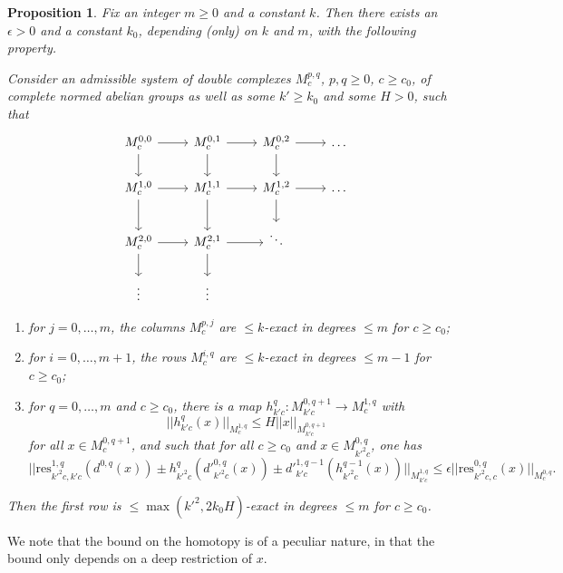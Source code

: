 \documentclass[11pt]{amsart}
\numberwithin{equation}{section}
\numberwithin{theorem}{section}
\newtheorem{proposition}[theorem]{Proposition}
\theoremstyle{definition}
\begin{document}
\begin{proposition}\label{prop:key} Fix an integer $m\geq 0$ and a constant $k$. Then there exists an $\epsilon>0$ and a constant $k_0$, depending (only) on $k$ and $m$, with the following property.

Consider an admissible system of double complexes $M^{p,q}_c$, $p,q\geq 0$, $c\geq c_0$, of complete normed abelian groups as well as some $k'\geq k_0$ and some $H>0$, such that
\[
	\begin{tikzcd}
		M^{0,0}_c \ar[r]{d'^{0,0}_c}\ar[d]{d^{0,0}_c} & M^{0,1}_c\ar[r]{d'^{0,1}_c}\ar[d]{d^{0,1}_c} & M^{0,2}_c\ar[r]{d'^{0,2}_c}\ar[d]{d^{0,2}_c} & \ldots\\
M^{1,0}_c\ar[r]{d'^{1,0}_c}\ar[d]{d^{1,0}_c} & M^{1,1}_c\ar[r]{d'^{1,1}_c}\ar[d]{d^{1,1}_c} & M^{1,2}_c\ar[r]{d'^{1,2}_c}\ar[d]{d^{1,2}_c} & \ldots\\
M^{2,0}_c\ar[r]{d'^{2,0}_c}\ar[d]{d^{2,0}_c} & M^{2,1}_c\ar[r]{d'^{2,1}_c}\ar[d]{d^{2,1}_c} & \ddots\\
\vdots & \vdots
	\end{tikzcd}
\]
\begin{enumerate}
\item for $j=0,\ldots,m$, the columns $M^{p,j}_c$ are $\leq k$-exact in degrees $\leq m$ for $c\geq c_0$;
\item for $i=0,\ldots,m+1$, the rows $M^{i,q}_c$ are $\leq k$-exact in degrees $\leq m-1$ for $c\geq c_0$;
\item for $q=0,\ldots,m$ and $c\geq c_0$, there is a map $h^q_{k'c}: M^{0,q+1}_{k'c}\to M^{1,q}_c$ with
\[
||h^q_{k'c}(x)||_{M^{1,q}_c}\leq H||x||_{M^{0,q+1}_{k'c}}
\]
for all $x\in M^{0,q+1}_c$, and such that for all $c\geq c_0$ and $x\in M^{0,q}_{k'^2c}$, one has
\begin{equation}\label{eq:homotopicmapsmall}
||\mathrm{res}_{k'^2c,k'c}^{1,q}(d^{0,q}(x))\pm h^q_{k'^2c}(d'^{0,q}_{k'^2c}(x))\pm d'^{1,q-1}_{k'c}(h^{q-1}_{k'^2c}(x))||_{M^{1,q}_{k'c}}\leq \epsilon ||\mathrm{res}_{k'^2c,c}^{0,q}(x)||_{M^{0,q}_c}.
\end{equation}
\end{enumerate}
Then the first row is $\leq \max(k'^2,2k_0H)$-exact in degrees $\leq m$ for $c\geq c_0$.
\end{proposition}

We note that the bound on the homotopy is of a peculiar nature, in that the bound only depends on a deep restriction of $x$.
\end{document}
